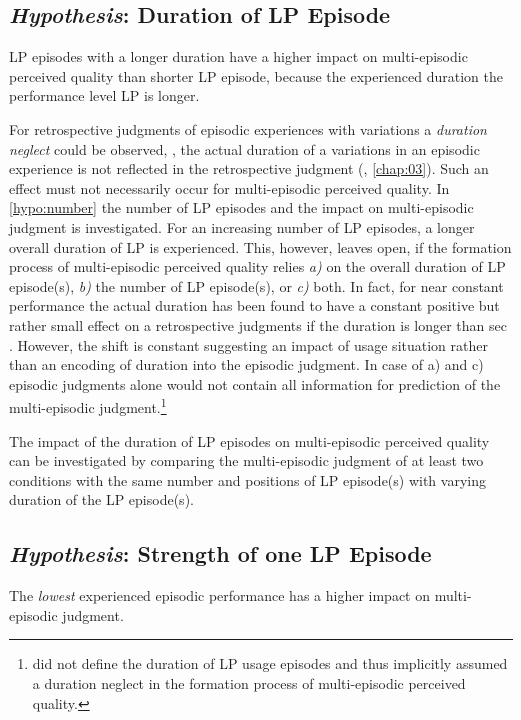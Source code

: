 \subsection{\emph{Hypothesis}: Duration of \acs{LP} Episode}
\begin{hypothesis}\label{hypo:duration}
\ac{LP} episodes with a longer duration have a higher impact on multi-episodic perceived quality than shorter \ac{LP} episode, because the experienced duration the performance level \ac{LP} is longer.
\end{hypothesis}

For retrospective judgments of episodic experiences with variations a \emph{duration neglect} could be observed, \ie, the actual duration of a variations in an episodic experience is not reflected in the retrospective judgment (\cf, \autoref{chap:03}).
Such an effect must not necessarily occur for multi-episodic perceived quality.
In \autoref{hypo:number} the number of \ac{LP} episodes and the impact on multi-episodic judgment is investigated.
For an increasing number of \ac{LP} episodes, a longer overall duration of \ac{LP} is experienced.
This, however, leaves open, if the formation process of multi-episodic perceived quality relies \emph{a)} on the overall duration of \ac{LP} episode(s), \emph{b)} the number of \ac{LP} episode(s), or \emph{c)} both.
In fact, for near constant performance the actual duration has been found to have a constant positive but rather small effect on a retrospective judgments if the duration is longer than \unit[30]{sec} \citep[\cf,][]{frohlich_qoe_2012}.
However, the shift is constant suggesting an impact of usage situation rather than an encoding of duration into the episodic judgment.
In case of a) and c) episodic judgments alone would not contain all information for prediction of the multi-episodic judgment.\footnote{\citet[p. 2]{moller_single-call_2011} did not define the duration of \ac{LP} usage episodes and thus implicitly assumed a duration neglect in the formation process of multi-episodic perceived quality.}

The impact of the duration of \ac{LP} episodes on multi-episodic perceived quality can be investigated by comparing the multi-episodic judgment of at least two conditions with the same number and positions of \ac{LP} episode(s) with varying duration of the \ac{LP} episode(s).

\subsection{\emph{Hypothesis}: Strength of one \acs{LP} Episode}
\begin{hypothesis}\label{hypo:strength}
The \emph{lowest} experienced episodic performance has a higher impact on multi-episodic judgment.
\end{hypothesis}

